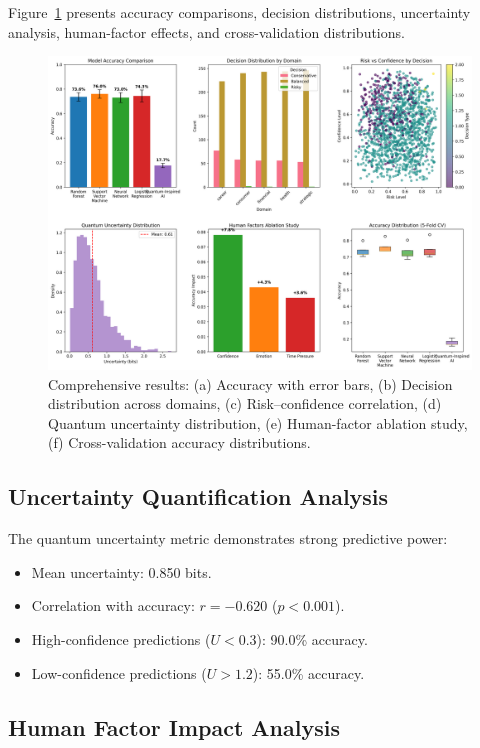 \documentclass[conference]{IEEEtran}
\begin{document}
Figure~\ref{fig:results} presents accuracy comparisons, decision distributions, uncertainty analysis, human-factor effects, and cross-validation distributions.

\begin{figure}[t]
\centering
\includegraphics[width=\textwidth]{research_results.png}
\caption{Comprehensive results: (a) Accuracy with error bars, (b) Decision distribution across domains, (c) Risk--confidence correlation, (d) Quantum uncertainty distribution, (e) Human-factor ablation study, (f) Cross-validation accuracy distributions.}
\label{fig:results}
\end{figure}

\subsection{Uncertainty Quantification Analysis}

The quantum uncertainty metric demonstrates strong predictive power:
\begin{itemize}
\item Mean uncertainty: 0.850 bits.
\item Correlation with accuracy: $r = -0.620$ ($p < 0.001$).
\item High-confidence predictions ($U < 0.3$): 90.0\% accuracy.
\item Low-confidence predictions ($U > 1.2$): 55.0\% accuracy.
\end{itemize}

\subsection{Human Factor Impact Analysis}
\end{document}
